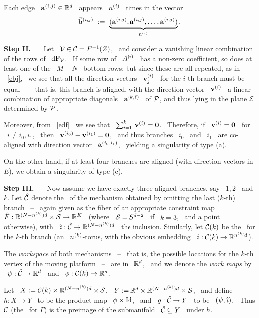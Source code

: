 Each edge \ $\mathbf{a}\sp{({i,j})}\in\mathbb{R}^{d}$ \ appears \ $n\sp{({i})}$ \ times in
the vector
%
\begin{equation}\label{ebj}
%
\bj{i}{j}~:=~\underbrace{(\aj{i,j},\aj{i,j},\dotsc,\aj{i,j})}_{\nj{i}}\vsm.
%
\end{equation}

\noindent\textbf{Step II.}~~~
%
Let \ $\mathcal{V}\in\mathcal{C}=F^{-1}(Z)$, \ and consider a vanishing linear
combination of the rows of \ $\operatorname{dF}_{\mathcal{V}}$. \ If some row of \ $A\sp{({i})}$ \
has a non-zero coefficient, so does at least one of the \ $M-N$ \
bottom rows; but since these are all repeated, as in \ \eqref{ebj}, \
we see that all the direction vectors \ $\mathbf{v}\sp{({i})}_{j}$ \
for the $i$-th branch must be equal \ -- \ that is, this
branch is aligned, with the direction vector \ $\mathbf{v}\sp{({i})}$ \ a linear
combination of appropriate diagonals \ $\mathbf{a}\sp{({k,\ell})}$ \ of $\mathcal{P}$, and
thus lying in the plane $\mathcal{E}$ determined by $\mathcal{P}$.

Moreover, from \ \eqref{edf} \ we see that \ $\sum_{i=1}^{k}\,\mathbf{v}\sp{({i})}=\mathbf{0}$. \
Therefore, if \ $\mathbf{v}\sp{({i})}=\mathbf{0}$ \ for \ $i\neq i_{0},i_{1}$, \ then \
$\mathbf{v}\sp{({i_{0}})}+\mathbf{v}\sp{({i_{1}})}=\mathbf{0}$, \ and thus branches \ $i_{0}$ \ and \
$i_{1}$ \ are co-aligned with direction vector \
$\mathbf{a}\sp{({i_{0},i_{1}})}$, \ yielding a singularity of type (a).

On the other hand, if at least four branches are aligned (with
direction vectors in $E$), we obtain a singularity of type (c)\vsm.

\noindent\textbf{Step III.}~~~
%
Now assume we have exactly three aligned branches, say \ $1,2$ \
and $k$. Let $\hat{\mathcal{C}}$ denote the \cspace\ of the mechanism obtained
by omitting the last ($k$-th) branch \ -- \ again given as the
fiber of an appropriate constraint map \
$\hat{F}:\mathbb{R}^{(N-n\sp{({k})})d}\times\mathcal{S}\to\mathbb{R}^{K}$ \ (where \
$\mathcal{S}=S^{d-2}$ \ if \ $k=3$, \ and a point otherwise), with \
$\hi:\hC\to\RRR^{(N-\nj{k})d}$ \ the inclusion. Similarly, let
$\mathcal{C}(k)$ be the \cspace\ for the $k$-th branch (an \ $n\sp{({k})}$-torus,
with the obvious embedding \ $i:\mathcal{C}(k)\to\mathbb{R}^{n\sp{({k})}d}$).

The \emph{workspace} of both mechanisms \ -- \ that is, the
possible locations for the $k$-th vertex of the moving platform \
-- \ are in  \ $\mathbb{R}^{d}$, \ and we denote the \emph{work maps} by
\ $\psi:\hat{\mathcal{C}}\to\mathbb{R}^{d}$ \ and \ $\phi:\mathcal{C}(k)\to\mathbb{R}^{d}$.

Let \ $X:=\mathcal{C}(k)\times\mathbb{R}^{(N-n\sp{({k})})d}\times\mathcal{S}$, \
$Y:=\mathbb{R}^{d}\times\mathbb{R}^{(N-n\sp{({k})})d}\times\mathcal{S}$, \ and define \
$h:X\to Y$ \ to be the product map \ $\phi\times\operatorname{Id}$, \ and \
$g:\hat{\mathcal{C}}\to Y$ \ to be \ $(\psi,\hi)$. \ Thus $\mathcal{C}$ (the \cspace\ for
$\Gamma$) is the preimage of the submanifold \ $\hat{\mathcal{C}}\subseteq Y$ \
under $h$.

